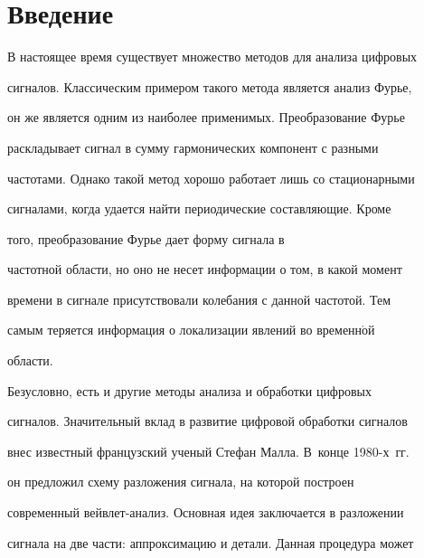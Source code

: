 




      \thispagestyle{headings}



      

            \label{st\stat}

            

\vspace*{-12pt}





\section{Введение}



В настоящее время существует множество методов для анализа цифровых

сигналов. Классическим примером такого метода является анализ Фурье,

он же является одним из наиболее применимых. Преобразование Фурье

раскладывает сигнал в сумму гармонических компонент с разными

частотами. Однако такой метод хорошо работает лишь со стационарными

сигналами, когда удается найти периодические составляющие. Кроме

того, преобразование Фурье дает форму сигнала в

частотной области, но оно не несет информации о том, в какой момент

времени в сигнале присутствовали колебания с данной частотой. Тем

самым теряется информация о локализации явлений во временн$\acute{\mbox{о}}$й

области.



Безусловно, есть и другие методы анализа и обработки цифровых

сигналов. Значительный вклад в развитие цифровой обработки сигналов

внес известный французский ученый Стефан Малла. В~конце 1980-х~гг.\

он предложил схему разложения сигнала, на которой построен

современный вейвлет-анализ. Основная идея заключается в разложении

сигнала на две части: аппроксимацию и детали. Данная процедура может

